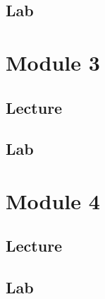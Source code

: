 \documentclass[
]{book}
\begin{document}
\section{Lab}\label{lab-1}

\chapter{Module 3}\label{module-3}

\section{Lecture}\label{lecture-2}

\section{Lab}\label{lab-2}

\chapter{Module 4}\label{module-4}

\section{Lecture}\label{lecture-3}

\section{Lab}\label{lab-3}

  
\end{document}
